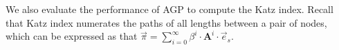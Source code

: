 We also evaluate the performance of AGP to compute the Katz index. Recall that Katz index numerates the paths of all lengths between a pair of nodes, which can be expressed as that $\vec{\pi}=\sum_{i=0}^\infty \beta^i \cdot \mathbf{A}^{i} \cdot \vec{e}_s$. 

